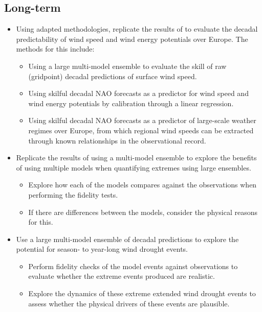 \documentclass{article}
\begin{document}
\subsection*{Long-term}

\begin{itemize}
    \item Using adapted methodologies, replicate the results of \cite{moemken2016decadal} to evaluate the decadal predictability of wind speed and wind energy potentials over Europe. The methods for this include:
    \begin{itemize}
        \item Using a large multi-model ensemble to evaluate the skill of raw (gridpoint) decadal predictions of surface wind speed. 
        \item Using skilful decadal NAO forecasts as a predictor for wind speed and wind energy potentials by calibration through a linear regression.
        \item Using skilful decadal NAO forecasts as a predictor of large-scale weather regimes over Europe, from which regional wind speeds can be extracted through known relationships in the observational record.
    \end{itemize}
    \item Replicate the results of \cite{kay2023variability} using a multi-model ensemble to explore the benefits of using multiple models when quantifying extremes using large ensembles.
    \begin{itemize}
        \item Explore how each of the models compares against the observations when performing the fidelity tests. 
        \item If there are differences between the models, consider the physical reasons for this.
    \end{itemize} 
    \item Use a large multi-model ensemble of decadal predictions to explore the potential for season- to year-long wind drought events. 
    \begin{itemize}
        \item Perform fidelity checks of the model events against observations to evaluate whether the extreme events produced are realistic.
        \item Explore the dynamics of these extreme extended wind drought events to assess whether the physical drivers of these events are plausible.
    \end{itemize} 
\end{itemize}
\end{document}
